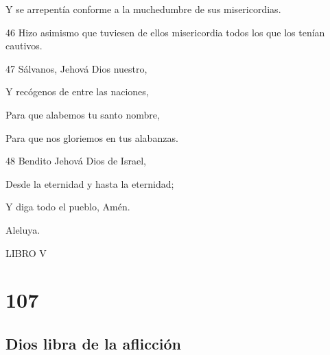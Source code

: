 \par Y se arrepentía conforme a la muchedumbre de sus misericordias.
\par 46 Hizo asimismo que tuviesen de ellos misericordia todos los que los tenían cautivos.
\par 47 Sálvanos, Jehová Dios nuestro,
\par Y recógenos de entre las naciones,
\par Para que alabemos tu santo nombre,
\par Para que nos gloriemos en tus alabanzas.
\par 48 Bendito Jehová Dios de Israel,
\par Desde la eternidad y hasta la eternidad;
\par Y diga todo el pueblo, Amén.
\par Aleluya.


\par LIBRO V

\chapter{107}

\section*{Dios libra de la aflicción}

